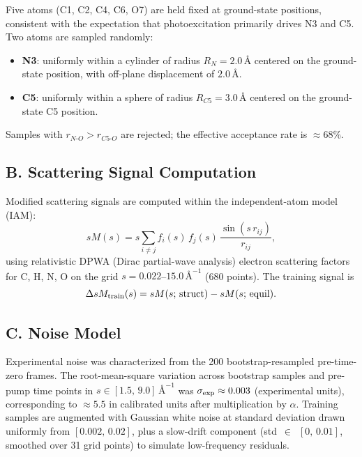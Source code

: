 \documentclass[12pt]{article}
\newcommand{\dsm}{\Delta sM}
\newcommand{\AAng}{\,\text{\AA}}
\newcommand{\anginv}{\,\text{\AA}^{-1}}
\begin{document}
Five atoms (C1, C2, C4, C6, O7) are held fixed at ground-state
positions, consistent with the expectation that photoexcitation
primarily drives N3 and C5.\cite{Zhang2017} Two atoms are sampled
randomly:
\begin{itemize}
  \item \textbf{N3}: uniformly within a cylinder of radius
    $R_N = 2.0\AAng$ centered on the ground-state position, with
    off-plane displacement of $2.0\AAng$.
  \item \textbf{C5}: uniformly within a sphere of radius
    $R_{C5} = 3.0\AAng$ centered on the ground-state C5 position.
\end{itemize}
Samples with $r_{N\text{-}O} > r_{C5\text{-}O}$ are rejected; the
effective acceptance rate is $\approx$68\%.

\subsection*{B.\; Scattering Signal Computation}

Modified scattering signals are computed within the independent-atom
model (IAM):\cite{Centurion2022}
\begin{equation}
  sM(s) = s\sum_{i\neq j} f_i(s)\,f_j(s)\,
  \frac{\sin(s\,r_{ij})}{r_{ij}},
  \label{eq:sM}
\end{equation}
using relativistic DPWA (Dirac partial-wave analysis) electron
scattering factors\cite{Ross1992} for C, H, N, O on the grid
$s = 0.022$--$15.0\anginv$ (680 points). The training signal is
\begin{equation}
  \dsm_{\rm train}(s) = sM(s;\,\text{struct}) - sM(s;\,\text{equil}).
\end{equation}

\subsection*{C.\; Noise Model}

Experimental noise was characterized from the 200 bootstrap-resampled
pre-time-zero frames. The root-mean-square variation across bootstrap
samples and pre-pump time points in $s \in [1.5,\,9.0]\anginv$ was
$\sigma_{\rm exp}\approx 0.003$ (experimental units), corresponding
to $\approx 5.5$ in calibrated units after multiplication by $\alpha$.
Training samples are augmented with Gaussian white noise at standard
deviation drawn uniformly from $[0.002,\,0.02]$, plus a slow-drift
component (std~$\in$~$[0,\,0.01]$, smoothed over 31 grid points) to
simulate low-frequency residuals.
\end{document}
